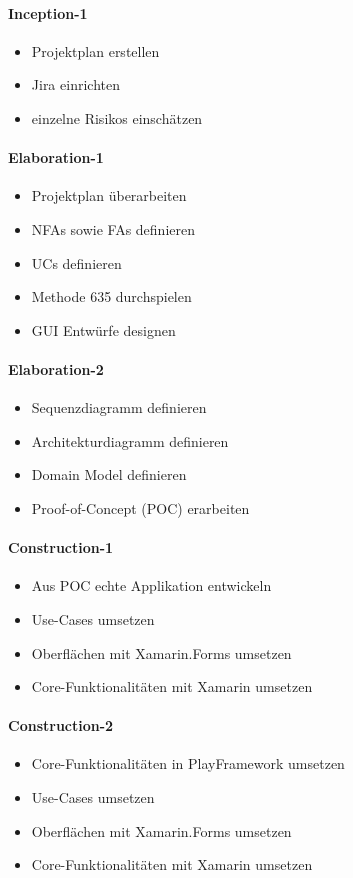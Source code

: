 \paragraph*{Inception-1}
\begin{itemize}
  \item Projektplan erstellen
  \item Jira einrichten
  \item einzelne Risikos einschätzen
\end{itemize}

\paragraph*{Elaboration-1}
\begin{itemize}
  \item Projektplan überarbeiten
  \item NFAs sowie FAs definieren
  \item UCs definieren
  \item Methode 635 durchspielen
  \item GUI Entwürfe designen
\end{itemize}

\paragraph*{Elaboration-2}
\begin{itemize}
  \item Sequenzdiagramm definieren
  \item Architekturdiagramm definieren
  \item Domain Model definieren
  \item Proof-of-Concept (POC) erarbeiten
\end{itemize}

\paragraph*{Construction-1}
\begin{itemize}
  \item Aus POC echte Applikation entwickeln
  \item Use-Cases umsetzen
  \item Oberflächen mit Xamarin.Forms umsetzen
  \item Core-Funktionalitäten mit Xamarin umsetzen
\end{itemize}

\paragraph*{Construction-2}
\begin{itemize}
  \item Core-Funktionalitäten in PlayFramework umsetzen
  \item Use-Cases umsetzen
  \item Oberflächen mit Xamarin.Forms umsetzen
  \item Core-Funktionalitäten mit Xamarin umsetzen
\end{itemize}

